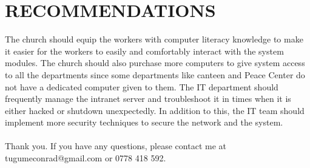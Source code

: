 \documentclass{report}
\begin{document}
\section {RECOMMENDATIONS}
The church should equip the workers with computer literacy knowledge to make it easier for the workers to easily and comfortably interact with the system modules.
The church should also purchase more computers to give system access to all the departments since some departments like canteen and Peace Center do not have a dedicated computer given to them.
The IT department should frequently manage the intranet server and troubleshoot it in times when it is either hacked or shutdown unexpectedly. In addition to this, the IT team should implement more security techniques to secure the network and the system.
\\\\
Thank you. If you have any questions, please contact me at tugumeconrad@gmail.com or 0778 418 592.
\end{document}

